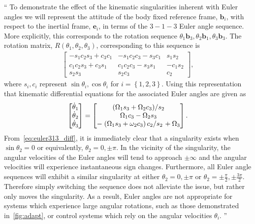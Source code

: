 \documentclass[11pt]{article}
\newcommand{\braces}[1]{\ensuremath{\left\{ #1 \right\}}}
\newcommand{\parenth}[1]{\ensuremath{\left( #1 \right)}}
\newcommand{\vecbf}[1]{\bm{#1}}
\newcommand{\slfrac}[2]{\left.#1\middle/#2\right.}
\newenvironment{correction}{\begin{list}{}{\setlength{\leftmargin}{1cm}\setlength{\rightmargin}{1cm}}\vspace{\parsep}\item[]``}{''\end{list}}
\begin{document}
\begin{enumerate}
\begin{correction}
To demonstrate the effect of the kinematic singularities inherent with Euler angles we will represent the attitude of the body fixed reference frame, \( \vecbf{b}_i \), with respect to the inertial frame, \( \vecbf{e}_i\), in terms of the \( 3-1-3\) Euler angle sequence.
More explicitly, this corresponds to the rotation sequence \( \theta_1 \vecbf{b}_3 , \theta_2 \vecbf{b}_1, \theta_3 \vecbf{b}_3 \).
The rotation matrix, \( R(\theta_1, \theta_2, \theta_3) \), corresponding to this sequence is 
\begin{align}\label{eq:euler313}
    \begin{bmatrix}
        -s_1 c_2 s_3 + c_3 c_1 & -s_1 c_2 c_3 - s_3 c_1 & s_1s_2 \\
        c_1 c_2 s_3 + c_3 s_1 & c_1 c_2 c_3 - s_3 s_1 & - c_1 s_2 \\
        s_2 s_3 & s_2 c_3 & c_2
    \end{bmatrix} ,
\end{align}
where \( s_i, c_i \) represent \( \sin \theta_i, \cos \theta_i \) for \( i = \braces{1,2,3}\).
Using this representation that kinematic differential equations for the associated Euler angles are given as
\begin{align}\label{eq:euler313_diff}
    \begin{bmatrix}
        \dot{\theta}_1 \\ \dot{\theta}_2 \\ \dot{\theta}_3 
    \end{bmatrix}
    =
    \begin{bmatrix}
        \slfrac{\parenth{\Omega_1 s_3 + \Omega_2 c_3}}{s_2} \\
        \Omega_1 c_3 - \Omega_2 s_3 \\
        -\slfrac{\parenth{\Omega_1 s_3 + \omega_2 c_3}c_2}{s_2} + \Omega_3
    \end{bmatrix} .
\end{align}
From~\cref{eq:euler313_diff}, it is immediately clear that a singularity exists when \( \sin \theta_2 = 0 \) or equivalently, \( \theta_2 = 0, \pm \pi \). 
In the vicinity of the singularity, the angular velocities of the Euler angles will tend to approach \( \pm \infty \) and the angular velocities will experience instantaneous sign changes.
Furthermore, all Euler angle sequences will exhibit a similar singularity at either \( \theta_2 = 0, \pm \pi \) or \( \theta_2 = \pm \frac{\pi}{2}, \pm \frac{3\pi}{2} \).
Therefore simply switching the sequence does not alleviate the issue, but rather only moves the singularity.
As a result, Euler angles are not appropriate for systems which experience large angular rotations, such as those demonstrated in~\cref{fig:adapt}, or control systems which rely on the angular velocities \( \theta_i \).
\end{correction}


\end{enumerate}
\end{document}

